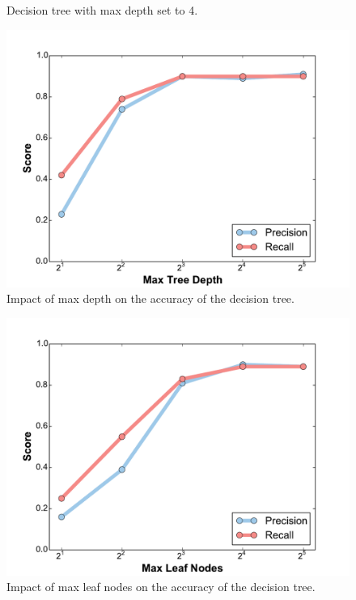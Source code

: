 \begin{itemize}
\begin{figure}[h!]
    \centering
    \caption{Decision tree with max depth set to 4.}
    \label{fig:tree_sample}
\end{figure}

\begin{figure}[h!]
    \centering
	\includegraphics[width=0.7\linewidth]{figure/depth.pdf}
	\caption{Impact of max depth on the accuracy of the decision tree.}
	\label{fig:tree_depth}
\end{figure}

\begin{figure}[h!]
    \centering
	\includegraphics[width=0.7\linewidth]{figure/leaves.pdf}
	\caption{Impact of max leaf nodes on the accuracy of the decision tree.}
	\label{fig:tree_leaves}
\end{figure}


\end{itemize}
